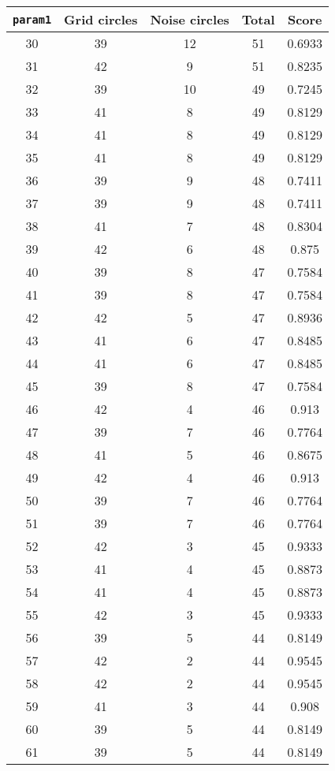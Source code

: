 \documentclass[letterpaper, 12pt]{article}
\begin{document}
\begin{longtable}{|c|c|c|c|c|}
\hline
\textbf{\texttt{param1}} & \textbf{Grid circles} & \textbf{Noise circles} & \textbf{Total} & \textbf{Score} \\
\hline
30 & 39 & 12 & 51 & 0.6933 \\
\hline
31 & 42 & 9 & 51 & 0.8235 \\
\hline
32 & 39 & 10 & 49 & 0.7245 \\
\hline
33 & 41 & 8 & 49 & 0.8129 \\
\hline
34 & 41 & 8 & 49 & 0.8129 \\
\hline
35 & 41 & 8 & 49 & 0.8129 \\
\hline
36 & 39 & 9 & 48 & 0.7411 \\
\hline
37 & 39 & 9 & 48 & 0.7411 \\
\hline
38 & 41 & 7 & 48 & 0.8304 \\
\hline
39 & 42 & 6 & 48 & 0.875 \\
\hline
40 & 39 & 8 & 47 & 0.7584 \\
\hline
41 & 39 & 8 & 47 & 0.7584 \\
\hline
42 & 42 & 5 & 47 & 0.8936 \\
\hline
43 & 41 & 6 & 47 & 0.8485 \\
\hline
44 & 41 & 6 & 47 & 0.8485 \\
\hline
45 & 39 & 8 & 47 & 0.7584 \\
\hline
46 & 42 & 4 & 46 & 0.913 \\
\hline
47 & 39 & 7 & 46 & 0.7764 \\
\hline
48 & 41 & 5 & 46 & 0.8675 \\
\hline
49 & 42 & 4 & 46 & 0.913 \\
\hline
50 & 39 & 7 & 46 & 0.7764 \\
\hline
51 & 39 & 7 & 46 & 0.7764 \\
\hline
52 & 42 & 3 & 45 & 0.9333 \\
\hline
53 & 41 & 4 & 45 & 0.8873 \\
\hline
54 & 41 & 4 & 45 & 0.8873 \\
\hline
55 & 42 & 3 & 45 & 0.9333 \\
\hline
56 & 39 & 5 & 44 & 0.8149 \\
\hline
57 & 42 & 2 & 44 & 0.9545 \\
\hline
58 & 42 & 2 & 44 & 0.9545 \\
\hline
59 & 41 & 3 & 44 & 0.908 \\
\hline
60 & 39 & 5 & 44 & 0.8149 \\
\hline
61 & 39 & 5 & 44 & 0.8149 \\

\end{longtable}
\end{document}

